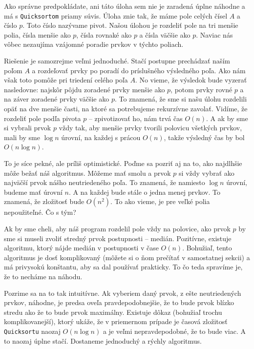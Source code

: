 
Ako správne predpokládate, ani táto úloha sem nie je zaradená úplne náhodne a má s
\texttt{Quicksortom} priamy súvis. Úloha znie tak, že máme pole celých čísel $A$ a číslo $p$. Toto
číslo nazývame pivot. Našou úlohou je rozdeliť pole na tri menšie polia, čísla menšie ako $p$, čísla
rovnaké ako $p$ a čísla väčšie ako $p$. Naviac nás vôbec nezaujíma vzájomné poradie prvkov v týchto
poliach.

Riešenie je samozrejme veľmi jednoduché. Stačí postupne prechádzať naším poľom $A$ a rozdeľovať
prvky po poradí do príslušného výsledného poľa. Ako nám však toto pomôže pri triedení celého poľa
$A$. No vieme, že výsledok bude vyzerať nasledovne: najskôr pôjdu zoradené prvky menšie ako $p$,
potom prvky rovné $p$ a na záver zoradené prvky väčšie ako $p$. To znamená, že sme si našu úlohu
rozdelili opäť na dve menšie časti, na ktoré sa potrebujeme rekurzívne zavolať. Vidíme, že rozdeliť
pole podľa pivota $p$ -- zpivotizovať ho, nám trvá čas $O(n)$. A ak by sme si vybrali prvok $p$ vždy
tak, aby menšie prvky tvorili polovicu všetkých prvkov, mali by sme $\log n$ úrovní, na každej s
prácou $O(n)$, takže výsledný čas by bol $O(n \log n)$.

To je síce pekné, ale príliš optimistické. Poďme sa pozriť aj na to, ako najdlhšie môže bežať náš
algoritmus. Môžeme mať smolu a prvok $p$ si vždy vybrať ako najväčší prvok nášho neutriedeného poľa.
To znamená, že namiesto $\log n$ úrovní, budeme mať úrovní $n$. A na každej bude stále o jedna menej
prvkov. To znamená, že zložitosť bude $O(n^2)$. To ako vieme, je pre veľké polia nepoužiteľné. Čo s
tým?

Ak by sme cheli, aby náš program rozdelil pole vždy na polovice, ako prvok $p$ by sme si museli
zvoliť stredný prvok postupnosti -- medián. Pozitívne, existuje algoritmu, ktorý nájde medián v
postupnosti v čase $O(n)$. Bohužiaľ, tento algoritmus je dosť komplikovaný (môžete si o ňom prečítať
v samostatnej sekcii) a má privysokú konštantu, aby sa dal používať prakticky. To čo teda spravíme
je, že to necháme na náhodu.

Pozrime sa na to tak intuitívne. Ak vyberiem daný prvok, z ešte neutriedených prvkov, náhodne, je
predsa oveľa pravdepodobnejšie, že to bude prvok blízko stredu ako že to bude prvok maximálny.
Existuje dôkaz (bohužiaľ trochu komplikovanejší), ktorý ukáže, že v priemernom prípade je časová
zložitosť \texttt{Quicksortu} naozaj $O(n \log n)$ a je veľmi nepravdepodobné, že to bude viac. A to
naozaj úplne stačí. Dostaneme jednoduchý a rýchly algoritmus.

